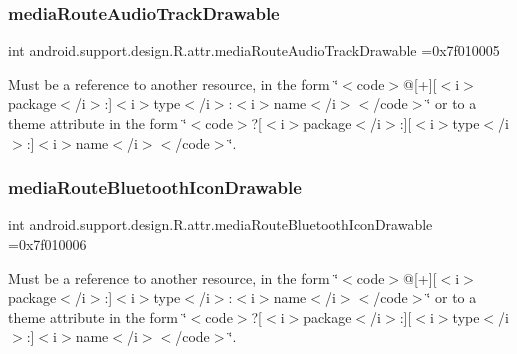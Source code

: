 \subsubsection{\texorpdfstring{media\+Route\+Audio\+Track\+Drawable}{mediaRouteAudioTrackDrawable}}
{\footnotesize\ttfamily int android.\+support.\+design.\+R.\+attr.\+media\+Route\+Audio\+Track\+Drawable =0x7f010005\hspace{0.3cm}{\ttfamily [static]}}

Must be a reference to another resource, in the form \char`\"{}$<$code$>$@\mbox{[}+\mbox{]}\mbox{[}$<$i$>$package$<$/i$>$\+:\mbox{]}$<$i$>$type$<$/i$>$\+:$<$i$>$name$<$/i$>$$<$/code$>$\char`\"{} or to a theme attribute in the form \char`\"{}$<$code$>$?\mbox{[}$<$i$>$package$<$/i$>$\+:\mbox{]}\mbox{[}$<$i$>$type$<$/i$>$\+:\mbox{]}$<$i$>$name$<$/i$>$$<$/code$>$\char`\"{}. \mbox{\label{classandroid_1_1support_1_1design_1_1R_1_1attr_a8e4bf19f2e14867e2921253204240ee0}} 
\subsubsection{\texorpdfstring{media\+Route\+Bluetooth\+Icon\+Drawable}{mediaRouteBluetoothIconDrawable}}
{\footnotesize\ttfamily int android.\+support.\+design.\+R.\+attr.\+media\+Route\+Bluetooth\+Icon\+Drawable =0x7f010006\hspace{0.3cm}{\ttfamily [static]}}

Must be a reference to another resource, in the form \char`\"{}$<$code$>$@\mbox{[}+\mbox{]}\mbox{[}$<$i$>$package$<$/i$>$\+:\mbox{]}$<$i$>$type$<$/i$>$\+:$<$i$>$name$<$/i$>$$<$/code$>$\char`\"{} or to a theme attribute in the form \char`\"{}$<$code$>$?\mbox{[}$<$i$>$package$<$/i$>$\+:\mbox{]}\mbox{[}$<$i$>$type$<$/i$>$\+:\mbox{]}$<$i$>$name$<$/i$>$$<$/code$>$\char`\"{}. \mbox{\label{classandroid_1_1support_1_1design_1_1R_1_1attr_afad013e5306e0d1f4a7b8a54f2fc1f42}} 
